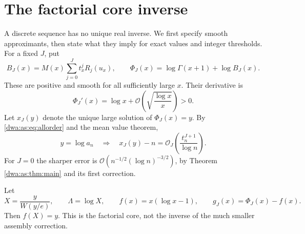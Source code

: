 \documentclass[11pt,letterpaper]{article}
\numberwithin{equation}{section}
\theoremstyle{remark}
\newcommand{\OO}{\mathcal O}
\begin{document}
\section{The factorial core inverse}\label{dwa:as:sec:inverse}
A discrete sequence has no unique real inverse. We first specify smooth approximants, then state what they imply for exact values and integer thresholds. For a fixed $J$, put
\begin{equation}\label{dwa:as:eq:model}
 B_J(x)=M(x)\sum_{j=0}^Jt_x^jR_j(u_x),\qquad
 \Phi_J(x)=\log\Gamma(x+1)+\log B_J(x).
\end{equation}
These are positive and smooth for all sufficiently large $x$. Their derivative is
\begin{equation}\label{dwa:as:eq:slope}
 \Phi_J'(x)=\log x+\OO\left(\sqrt{\frac{\log x}{x}}\right)>0.
\end{equation}
Let $x_J(y)$ denote the unique large solution of $\Phi_J(x)=y$. By \eqref{dwa:as:eq:allorder} and the mean value theorem,
\begin{equation}\label{dwa:as:eq:transport}
 y=\log a_n\quad\Longrightarrow\quad
 x_J(y)-n=\OO_J\left(\frac{t_n^{J+1}}{\log n}\right).
\end{equation}
For $J=0$ the sharper error is $\OO(n^{-1/2}(\log n)^{-3/2})$, by Theorem \ref{dwa:as:thm:main} and its first correction.

Let
\begin{equation}\label{dwa:as:eq:factorialcore}
 X=\frac{y}{W(y/e)},\qquad \Lambda=\log X,
 \qquad f(x)=x(\log x-1),\qquad g_J(x)=\Phi_J(x)-f(x).
\end{equation}
Then $f(X)=y$. This is the factorial core, not the inverse of the much smaller assembly correction.
\end{document}

